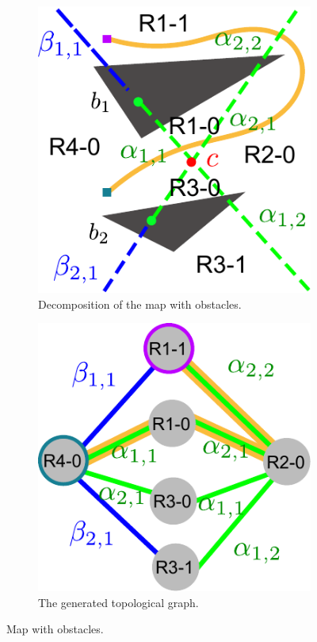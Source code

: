 \documentclass[phd]{byuprop}
\begin{document}
\begin{figure}[htbp]
	\centering
	\begin{subfigure}[t]{0.27\linewidth}
		\centering
		\includegraphics[width=\textwidth]{fig/obs_map.pdf}
		\caption{Decomposition of the map with obstacles.}
		\label{fig:obs_map:map}
	\end{subfigure}  
	\begin{subfigure}[t]{0.27\linewidth}
		\centering
		\includegraphics[width=\textwidth]{fig/obs_topology.pdf}
		\caption{The generated topological graph.}
		\label{fig:obs_map:topology}
	\end{subfigure}   
	\caption{Map with obstacles.}
	\label{fig:obs_map}
\end{figure}
\end{document}
